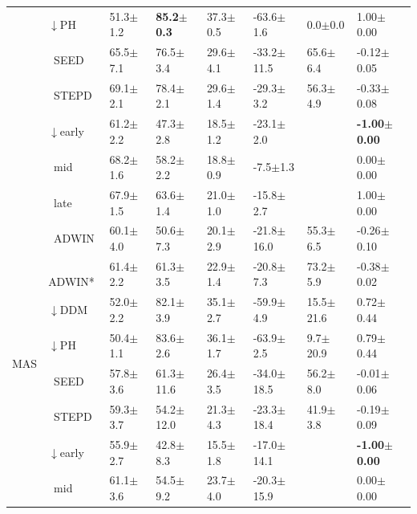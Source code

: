 \begin{tabular}{llllllll}
 & $\downarrow$PH & 51.3\tiny{$\pm$1.2} & \textbf{85.2\tiny{$\pm$0.3}} & 37.3\tiny{$\pm$0.5} & -63.6\tiny{$\pm$1.6} & 0.0\tiny{$\pm$0.0} & 1.00\tiny{$\pm$0.00} \\
 & $\ \;$SEED & 65.5\tiny{$\pm$7.1} & 76.5\tiny{$\pm$3.4} & 29.6\tiny{$\pm$4.1} & -33.2\tiny{$\pm$11.5} & 65.6\tiny{$\pm$6.4} & -0.12\tiny{$\pm$0.05} \\
 & $\ \;$STEPD & 69.1\tiny{$\pm$2.1} & 78.4\tiny{$\pm$2.1} & 29.6\tiny{$\pm$1.4} & -29.3\tiny{$\pm$3.2} & 56.3\tiny{$\pm$4.9} & -0.33\tiny{$\pm$0.08} \\
 & $\downarrow$early & 61.2\tiny{$\pm$2.2} & 47.3\tiny{$\pm$2.8} & 18.5\tiny{$\pm$1.2} & -23.1\tiny{$\pm$2.0} &  & \textbf{-1.00\tiny{$\pm$0.00}} \\
 & $\ \;$mid & 68.2\tiny{$\pm$1.6} & 58.2\tiny{$\pm$2.2} & 18.8\tiny{$\pm$0.9} & -7.5\tiny{$\pm$1.3} &  & 0.00\tiny{$\pm$0.00} \\
 & $\ \;$late & 67.9\tiny{$\pm$1.5} & 63.6\tiny{$\pm$1.4} & 21.0\tiny{$\pm$1.0} & -15.8\tiny{$\pm$2.7} &  & 1.00\tiny{$\pm$0.00} \\
\midrule
\multirow[t]{9}{*}{MAS} & $\ \;$ADWIN & 60.1\tiny{$\pm$4.0} & 50.6\tiny{$\pm$7.3} & 20.1\tiny{$\pm$2.9} & -21.8\tiny{$\pm$16.0} & 55.3\tiny{$\pm$6.5} & -0.26\tiny{$\pm$0.10} \\
 & $\ \;$ADWIN* & 61.4\tiny{$\pm$2.2} & 61.3\tiny{$\pm$3.5} & 22.9\tiny{$\pm$1.4} & -20.8\tiny{$\pm$7.3} & 73.2\tiny{$\pm$5.9} & -0.38\tiny{$\pm$0.02} \\
 & $\downarrow$DDM & 52.0\tiny{$\pm$2.2} & 82.1\tiny{$\pm$3.9} & 35.1\tiny{$\pm$2.7} & -59.9\tiny{$\pm$4.9} & 15.5\tiny{$\pm$21.6} & 0.72\tiny{$\pm$0.44} \\
 & $\downarrow$PH & 50.4\tiny{$\pm$1.1} & 83.6\tiny{$\pm$2.6} & 36.1\tiny{$\pm$1.7} & -63.9\tiny{$\pm$2.5} & 9.7\tiny{$\pm$20.9} & 0.79\tiny{$\pm$0.44} \\
 & $\ \;$SEED & 57.8\tiny{$\pm$3.6} & 61.3\tiny{$\pm$11.6} & 26.4\tiny{$\pm$3.5} & -34.0\tiny{$\pm$18.5} & 56.2\tiny{$\pm$8.0} & -0.01\tiny{$\pm$0.06} \\
 & $\ \;$STEPD & 59.3\tiny{$\pm$3.7} & 54.2\tiny{$\pm$12.0} & 21.3\tiny{$\pm$4.3} & -23.3\tiny{$\pm$18.4} & 41.9\tiny{$\pm$3.8} & -0.19\tiny{$\pm$0.09} \\
 & $\downarrow$early & 55.9\tiny{$\pm$2.7} & 42.8\tiny{$\pm$8.3} & 15.5\tiny{$\pm$1.8} & -17.0\tiny{$\pm$14.1} &  & \textbf{-1.00\tiny{$\pm$0.00}} \\
 & $\ \;$mid & 61.1\tiny{$\pm$3.6} & 54.5\tiny{$\pm$9.2} & 23.7\tiny{$\pm$4.0} & -20.3\tiny{$\pm$15.9} &  & 0.00\tiny{$\pm$0.00} \\

\end{tabular}
